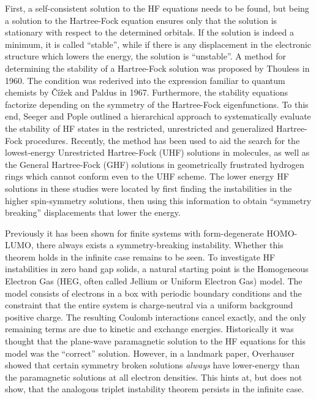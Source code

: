 \documentclass[preprint, journal=prl]{revtex4-1}
\begin{document}
  First, a self-consistent solution to the HF equations needs to be found, but being a solution to the Hartree-Fock equation ensures only that the solution is stationary with respect to the determined orbitals. If the solution is indeed a minimum, it is called ``stable'', while if there is any displacement in the electronic structure which lowers the energy, the solution is ``unstable''. A method for determining the stability of a Hartree-Fock solution was proposed by Thouless in 1960\cite{Thouless1960}. The condition was rederived into the expression familiar to quantum chemists by Čížek and Paldus in 1967\cite{Cizek1967}. Furthermore, the stability equations factorize depending on the symmetry of the Hartree-Fock eigenfunctions. To this end, Seeger and Pople outlined a hierarchical approach to systematically evaluate the stability of HF states in the restricted, unrestricted and generalized Hartree-Fock procedures\cite{Seeger1977}. Recently, the method has been used to aid the search for the lowest-energy Unrestricted Hartree-Fock (UHF) solutions in molecules, as well as the General Hartree-Fock (GHF) solutions in geometrically frustrated hydrogen rings which cannot conform even to the UHF scheme\cite{Pulay2016, Goings2015}. The lower energy HF solutions in these studies were located by first finding the instabilities in the higher spin-symmetry solutions, then using this information to obtain ``symmetry breaking'' displacements that lower the energy.    
    
  Previously it has been shown for finite systems with form-degenerate HOMO-LUMO, there always exists a symmetry-breaking instability\cite{Yamada2015}. Whether this theorem holds in the infinite case remains to be seen. To investigate HF instabilities in zero band gap solids, a natural starting point is the Homogeneous Electron Gas (HEG, often called Jellium or Uniform Electron Gas) model. The model consists of electrons in a box with periodic boundary conditions  and the constraint that the entire system is charge-neutral via a uniform background positive  charge. The resulting Coulomb interactions cancel exactly, and the only remaining terms are due   to kinetic and exchange energies. Historically it was thought that the plane-wave paramagnetic solution to the HF equations for this model was the ``correct'' solution. However, in a landmark paper, Overhauser showed that certain symmetry broken solutions \emph{always} have lower-energy than the paramagnetic solutions at all electron densities\cite{Overhauser1962}. This hints at, but does not show, that the analogous triplet instability theorem persists in the infinite case.  
        
\end{document}
